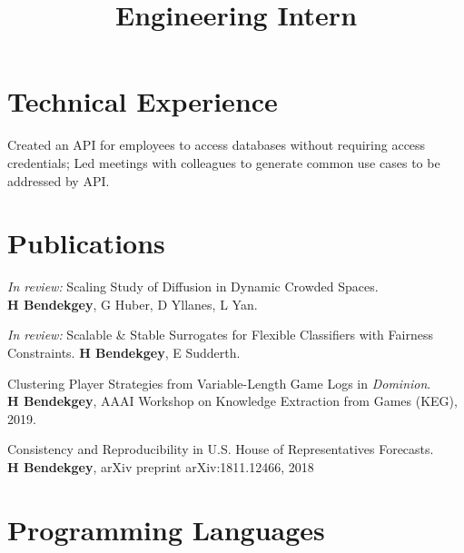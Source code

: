 \documentclass[margin]{res}
\begin{document}
\begin{resume}
\begin{position}
\end{position}

\section{Technical Experience}

\location{}
\title{\textbf{Engineering Intern}}
\begin{position}
Created an API for employees to access databases without requiring access credentials;
Led meetings with colleagues to generate common use cases to be addressed by API.\end{position}


\section{Publications}
\par
\emph{In review:} Scaling Study of Diffusion in Dynamic Crowded Spaces. \\\textbf{H Bendekgey}, G Huber, D Yllanes, L Yan.

\emph{In review:} Scalable \& Stable Surrogates for Flexible Classifiers with Fairness \\Constraints. \textbf{H Bendekgey}, E Sudderth.

Clustering Player Strategies from Variable-Length Game Logs in \emph{Dominion}.\\ \textbf{H Bendekgey}, AAAI Workshop on Knowledge Extraction from Games (KEG), 2019.

Consistency and Reproducibility in U.S. House of Representatives Forecasts.\\ \textbf{H Bendekgey}, arXiv preprint arXiv:1811.12466, 2018


\section{Programming Languages}


\end{resume}
\end{document}
